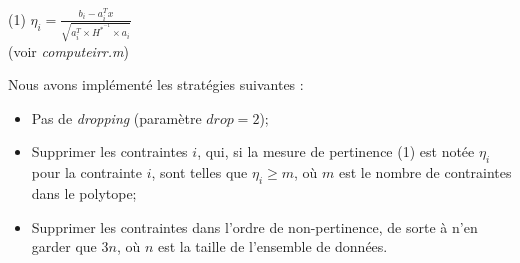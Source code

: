 \documentclass{article}
\begin{document}
\begin{center}
(1) $\eta_i = \frac{b_i - a_i^Tx}{\sqrt{a_i^T \times H^*^{-1} \times a_i}}$\\
(voir \emph{computeirr.m})
\end{center}

Nous avons implémenté les stratégies suivantes :\\

\begin{itemize}
\item Pas de \emph{dropping} (paramètre $drop = 2$);
\item Supprimer les contraintes $i$, qui, si la mesure de pertinence (1) est notée $\eta_i$ pour la contrainte $i$, sont telles que $\eta_i \geq m$, où $m$ est le nombre de contraintes dans le polytope;
\item Supprimer les contraintes dans l'ordre de non-pertinence, de sorte à n'en garder que $3n$, où $n$ est la taille de l'ensemble de données.
\end{itemize}
\end{document}
